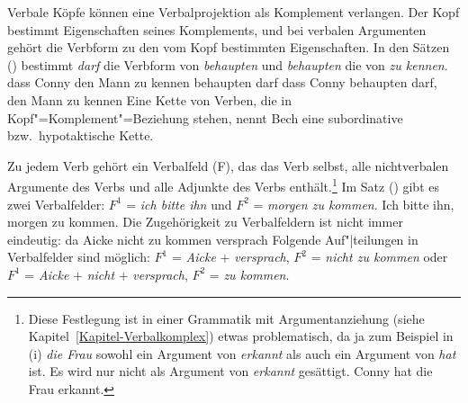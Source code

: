 
Verbale Köpfe können eine Verbalprojektion als Komplement verlangen. Der Kopf bestimmt
Eigenschaften seines Komplements, und bei verbalen Argumenten gehört die Verbform zu 
den vom Kopf bestimmten Eigenschaften. In den Sätzen () bestimmt \emph{darf}
die Verbform von \emph{behaupten} und \emph{behaupten} die von \emph{zu kennen}.
\eal
\ex dass Conny den Mann zu kennen behaupten darf
\ex dass Conny behaupten darf, den Mann zu kennen
\zl
Eine Kette von Verben, die in Kopf"=Komplement"=Beziehung stehen, nennt Bech eine subordinative
bzw.\ hypotaktische Kette.%
%
%
%
%


%
%
Zu jedem Verb gehört ein Verbalfeld (F), das das Verb selbst, alle nichtverbalen
Argumente des Verbs und alle Adjunkte des Verbs enthält.\footnote{
        Diese Festlegung ist in einer Grammatik mit Argumentanziehung
        (siehe Kapitel~\ref{Kapitel-Verbalkomplex}) etwas
        problematisch, da ja zum Beispiel in (i) \emph{die Frau} sowohl ein
        Argument von \emph{erkannt} als auch ein Argument von \emph{hat} ist.
        Es wird nur nicht als Argument von \emph{erkannt} gesättigt.
\ea
Conny hat die Frau erkannt.
\zlast%
}
Im Satz () gibt es zwei Verbalfelder: $F^1$ = \emph{ich bitte ihn} und $F^2$ =
\emph{morgen zu kommen}.
\ea
Ich bitte ihn, morgen zu kommen.
\z
Die Zugehörigkeit zu Verbalfeldern ist nicht immer eindeutig:
\ea
\label{zu_kommen_versprach}
da Aicke nicht zu kommen versprach
\z
Folgende Auf"|teilungen in Verbalfelder sind möglich: $F^1$ = \emph{Aicke} + \emph{versprach},
$F^2$ = \emph{nicht zu kommen} oder $F^1$ = \emph{Aicke} + \emph{nicht} + \emph{versprach}, 
$F^2$ = \emph{zu kommen}.

